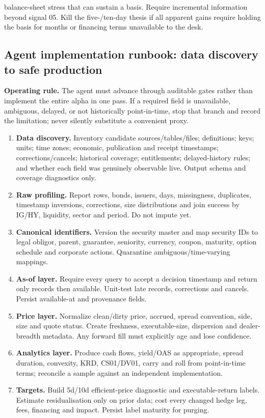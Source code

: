 \documentclass[10pt]{article}
\begin{document}
balance-sheet stress that can sustain a basis. Require incremental information beyond signal 05. Kill the five-/ten-day thesis if all apparent gains require holding the basis for months or financing terms unavailable to the desk.
\subsection{Agent implementation runbook: data discovery to safe production}
\textbf{Operating rule.} The agent must advance through auditable gates rather than implement the entire alpha in one pass. If a required field is unavailable, ambiguous, delayed, or not historically point-in-time, stop that branch and record the limitation; never silently substitute a convenient proxy.
\begin{enumerate}[leftmargin=2em,label=\textbf{A\arabic*.}]
\item \textbf{Data discovery.} Inventory candidate sources/tables/files; definitions; keys; units; time zones; economic, publication and receipt timestamps; corrections/cancels; historical coverage; entitlements; delayed-history rules; and whether each field was genuinely observable live. Output schema and coverage diagnostics only.
\item \textbf{Raw profiling.} Report rows, bonds, issuers, days, missingness, duplicates, timestamp inversions, corrections, size distributions and join success by IG/HY, liquidity, sector and period. Do not impute yet.
\item \textbf{Canonical identifiers.} Version the security master and map security IDs to legal obligor, parent, guarantee, seniority, currency, coupon, maturity, option schedule and corporate actions. Quarantine ambiguous/time-varying mappings.
\item \textbf{As-of layer.} Require every query to accept a decision timestamp and return only records then available. Unit-test late records, corrections and cancels. Persist available-at and provenance fields.
\item \textbf{Price layer.} Normalize clean/dirty price, accrued, spread convention, side, size and quote status. Create freshness, executable-size, dispersion and dealer-breadth metadata. Any forward fill must explicitly age and lose confidence.
\item \textbf{Analytics layer.} Produce cash flows, yield/OAS as appropriate, spread duration, convexity, KRD, CS01/DV01, carry and roll from point-in-time terms; reconcile a sample against an independent implementation.
\item \textbf{Targets.} Build 5d/10d efficient-price diagnostic and executable-return labels. Estimate residualisation only on prior data; cost every changed hedge leg, fees, financing and impact. Persist label maturity for purging.

\end{enumerate}
\end{document}
